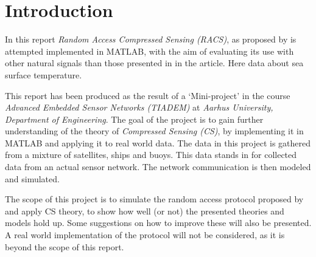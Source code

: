 \documentclass[Main]{subfiles}
\begin{document}
\section{Introduction} %
\label{sec:introduction}
	In this report \emph{Random Access Compressed Sensing (RACS)}, as proposed by \cite{Fazel2011} is attempted implemented in MATLAB, with the aim of evaluating its use with other natural signals than those presented in in the article.
	Here data about sea surface temperature.

	This report has been produced as the result of a `Mini-project' in the course \emph{Advanced Embedded Sensor Networks (TIADEM)} at \emph{Aarhus University, Department of Engineering}.
	The goal of the project is to gain further understanding of the theory of \emph{Compressed Sensing (CS)}, by implementing it in MATLAB and applying it to real world data.
	The data in this project is gathered from a mixture of satellites, ships and buoys.
	This data stands in for collected data from an actual sensor network.
	The network communication is then modeled and simulated.

	The scope of this project is to simulate the random access protocol proposed by \cite{Fazel2011} and apply CS theory, to show how well (or not) the presented theories and models hold up.
	Some suggestions on how to improve these will also be presented.
	A real world implementation of the protocol will not be considered, as it is beyond the scope of this report.




\end{document}
